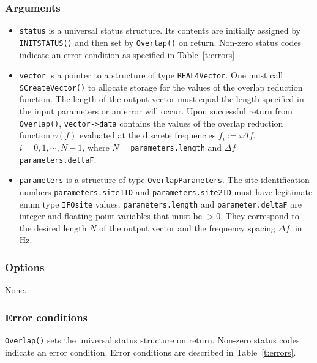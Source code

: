 \documentclass{article}
\begin{document}
\subsubsection{Arguments}

\begin{itemize}
\item 
{\tt status\/} is a universal status structure. 
Its contents are initially assigned by {\tt INITSTATUS()\/} and then 
set by {\tt Overlap()\/} on return. 
Non-zero status codes indicate an error condition as specified in 
Table~\ref{t:errors}
\item 
{\tt vector\/} is a pointer to a structure of type {\tt REAL4Vector}.
One must call {\tt SCreateVector()\/} to allocate storage for the
values of the overlap reduction function.
The length of the output vector must equal the length specified in
the input parameters or an error will occur.
Upon successful return from {\tt Overlap()\/},
{\tt vector->data\/} contains the 
values of the overlap reduction function $\gamma(f)$ evaluated at the
discrete frequencies $f_i:=i\Delta f$, $i=0,1,\cdots, N-1$, where
$N=${\tt parameters.length\/} and $\Delta f=${\tt parameters.deltaF\/}.
\item 
{\tt parameters\/} is a structure of type {\tt OverlapParameters\/}.
The site identification numbers 
{\tt parameters.site1ID\/} and {\tt parameters.site2ID\/} must have 
legitimate enum type {\tt IFOsite} values.
{\tt parameters.length} and {\tt parameter.deltaF} are integer and
floating point variables that must be $> 0$.
They correspond to the desired length $N$ of the output vector and
the frequency spacing $\Delta f$, in Hz.
\end{itemize}

\subsubsection{Options}

None.

\subsubsection{Error conditions}

{\tt Overlap()\/} sets the universal status structure on return. 
Non-zero status codes indicate an error condition. 
Error conditions are described in Table~\ref{t:errors}.
\end{document}
